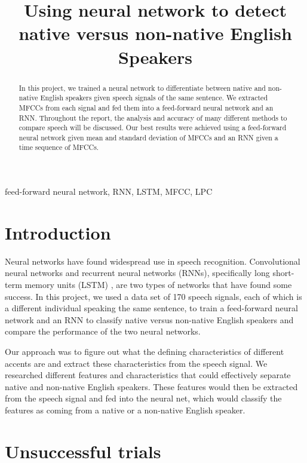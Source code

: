 \documentclass{article}
\title{Using neural network to detect native versus non-native English Speakers}
\begin{document}

\maketitle

\begin{abstract}
	In this project, we trained a neural network to differentiate between native and non-native English speakers given speech signals of the same sentence.
	We extracted MFCCs from each signal and fed them into a feed-forward neural network and an RNN.
	Throughout the report, the analysis and accuracy of many different methods to compare speech will be discussed. 
	Our best results were achieved using a feed-forward neural network given mean and standard deviation of MFCCs and an RNN given a time sequence of MFCCs.
\end{abstract}

\begin{keywords}
feed-forward neural network,
RNN,
LSTM,
MFCC,
LPC
\end{keywords}

\section{Introduction}
\label{sec:intro}

Neural networks have found widespread use in speech recognition.
Convolutional neural networks \cite{microsoft} and recurrent neural networks (RNNs), specifically long short-term memory units (LSTM) \cite{google}, are two types of networks that have found some success. 
In this project, we used a data set of 170 speech signals, each of which is a different individual speaking the same sentence, to train a feed-forward neural network and an RNN to classify native versus non-native English speakers and compare the performance of the two neural networks. 

Our approach was to figure out what the defining characteristics of different accents are and extract these characteristics from the speech signal.
We researched different features and characteristics that could effectively separate native and non-native English speakers.
These features would then be extracted from the speech signal and fed into the neural net, which would classify the features as coming from a native or a non-native English speaker.

\section{Unsuccessful trials}
\label{sec:unsuccessful}
\end{document}
